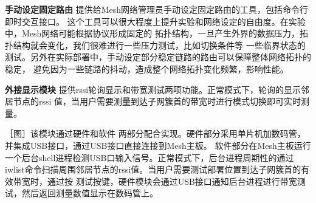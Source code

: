 \textbf{手动设定固定路由} 提供给Mesh网络管理员手动设定固定路由的工具，包括命令行即时交互接口。
这个工具可以很大程度上提升实验和网络设定的自由度。在实验中，Mesh网络可能根据协议形成固定的
拓扑结构，一旦产生外界的数据压力，拓扑结构就会变化，我们很难进行一些压力测试，比如切换条件等
一些临界状态的测试。另外在实际部署中，手动设定部分稳定链路的路由可以保障整体网络拓扑的稳定，
避免因为一些链路的抖动，造成整个网络拓扑变化频繁，影响性能。

\textbf{外接显示模块} 提供rssi轮询显示和带宽测试两项功能。正常模式下，轮询的显示邻居节点的rssi
值，当用户需要测量到达子网簇首的带宽时进行模式切换即可实时测量。

［图］该模块通过硬件和软件
两部分配合实现。硬件部分采用单片机加数码管，并集成USB接口，通过USB接口直接连接到Mesh主板。
软件部分在Mesh主板运行一个后台shell进程检测USB口输入信号。正常模式下，后台进程周期性的通过
iwlist命令扫描周围邻居节点的rssi值。当用户需要测试部署位置到达子网簇首的有效带宽时，通过按
测试按键，硬件模块会通过USB接口通知后台进程进行带宽测试，然后返回测量数值显示在数码管上。
